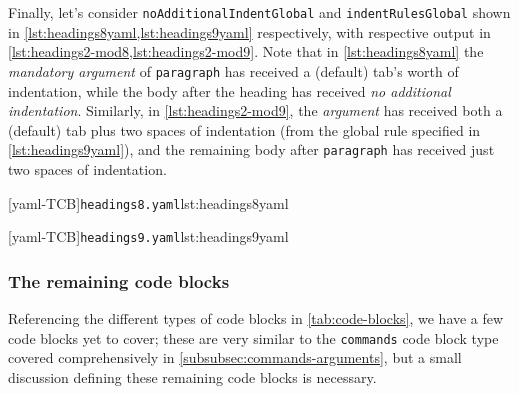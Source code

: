 \documentclass[10pt]{article}
\begin{document}
 \begin{example}
 Finally, let's consider \texttt{noAdditionalIndentGlobal} and \texttt{indentRulesGlobal}
 shown in \cref{lst:headings8yaml,lst:headings9yaml} respectively, with respective output
 in \cref{lst:headings2-mod8,lst:headings2-mod9}. Note that in \cref{lst:headings8yaml}
 the \emph{mandatory argument} of \texttt{paragraph} has received a (default) tab's worth
 of indentation, while the body after the heading has received \emph{no additional
 indentation}. Similarly, in \cref{lst:headings2-mod9}, the \emph{argument} has received
 both a (default) tab plus two spaces of indentation (from the global rule specified in
 \cref{lst:headings9yaml}), and the remaining body after \texttt{paragraph} has received
 just two spaces of indentation.

 \begin{cmhtcbraster}
  [yaml-TCB]{\texttt{headings8.yaml}}{lst:headings8yaml}
 \end{cmhtcbraster}

 \begin{cmhtcbraster}
  [yaml-TCB]{\texttt{headings9.yaml}}{lst:headings9yaml}
 \end{cmhtcbraster}
 \end{example}
\subsubsection{The remaining code blocks}
 Referencing the different types of code blocks in \vref{tab:code-blocks}, we have a few
 code blocks yet to cover; these are very similar to the \texttt{commands} code block
 type covered comprehensively in \vref{subsubsec:commands-arguments}, but a small
 discussion defining these remaining code blocks is necessary.
\end{document}
